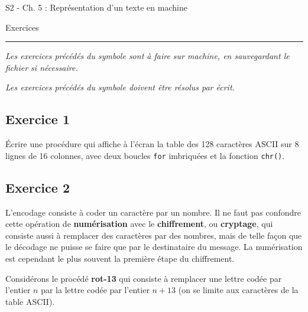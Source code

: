 \documentclass[11pt,a4paper]{article}
\renewcommand{\emph}{\textit}
\begin{document}
    
    
     
    \chead{} 
    \cfoot{}
    \renewcommand{\headrulewidth}{0pt}
    \renewcommand{\footrulewidth}{0pt}
    
    \Huge S2 - Ch. 5 : Représentation d'un texte en machine  

    \vspace{.25cm}
    \normalsize Exercices  
    
    \vspace{.25cm}
    \hrule
    
    \vspace{.5cm}

  


\emph{Les exercices précédés du symbole \faDesktop{}
sont à faire sur machine, en sauvegardant le fichier si nécessaire.}

\emph{Les exercices précédés du symbole \faPencil* doivent
être résolus par écrit.}

\hypertarget{fontawesome-solid-computer-exercice-1}{%
\subsection*{\faDesktop{} Exercice
1}\label{fontawesome-solid-computer-exercice-1}}

Écrire une procédure qui affiche à l'écran la table des 128 caractères
ASCII sur 8 lignes de 16 colonnes, avec deux boucles \texttt{for}
imbriquées et la fonction \texttt{chr()}.

 

\hypertarget{fontawesome-solid-computer-exercice-2}{%
\subsection*{\faDesktop{} Exercice
2}\label{fontawesome-solid-computer-exercice-2}}

L'encodage consiste à coder un caractère par un nombre. Il ne faut pas
confondre cette opération de \textbf{numérisation} avec le
\textbf{chiffrement}, ou \textbf{cryptage}, qui consiste aussi à
remplacer des caractères par des nombres, mais de telle façon que le
décodage ne puisse se faire que par le destinataire du message. La
numérisation est cependant le plus souvent la première étape du
chiffrement.

Considérons le procédé \textbf{rot-13} qui consiste à remplacer une
lettre codée par l'entier \(n\) par la lettre codée par l'entier
\(n+13\) (on se limite aux caractères de la table ASCII).
\end{document}
